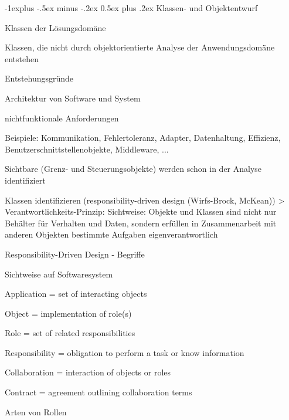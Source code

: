 \documentclass[a4paper]{article}
\makeatletter
\renewcommand{\subsection}{\@startsection{subsection}{2}{0mm}%
                                {-1explus -.5ex minus -.2ex}%
                                {0.5ex plus .2ex}%
                                {\normalfont\normalsize\bfseries}}
\makeatother
\begin{document}
\begin{multicols}{3}
  \subsection{Klassen- und Objektentwurf}
  \begin{itemize*}
    \item Klassen der Lösungsdomäne
    \begin{itemize*}
      \item Klassen, die nicht durch objektorientierte Analyse der Anwendungsdomäne entstehen
    \end{itemize*}
    \item Entstehungsgründe
    \begin{itemize*}
      \item Architektur von Software und System
      \item nichtfunktionale Anforderungen
      \item Beispiele: Kommunikation, Fehlertoleranz, Adapter, Datenhaltung, Effizienz, Benutzerschnittstellenobjekte, Middleware, ...
      \item Sichtbare (Grenz- und Steuerungsobjekte) werden schon in der Analyse identifiziert
    \end{itemize*}
  \end{itemize*}

  Klassen identifizieren (responsibility-driven design (Wirfs-Brock, McKean))
  > Verantwortlichkeits-Prinzip: Sichtweise: Objekte und Klassen sind nicht nur Behälter für Verhalten und Daten, sondern erfüllen in Zusammenarbeit mit anderen Objekten bestimmte Aufgaben eigenverantwortlich

  Responsibility-Driven Design - Begriffe
  \begin{itemize*}
    \item Sichtweise auf Softwaresystem
    \item Application = set of interacting objects
    \item Object = implementation of role(s)
    \item Role = set of related responsibilities
    \item Responsibility = obligation to perform a task or know information
    \item Collaboration = interaction of objects or roles
    \item Contract = agreement outlining collaboration terms
  \end{itemize*}

  Arten von Rollen


\end{multicols}
\end{document}
